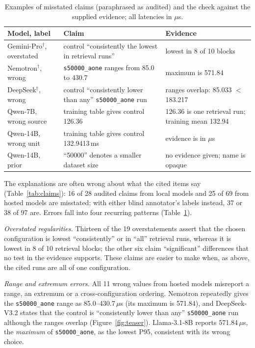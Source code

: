 \begin{table}[t]
\centering\footnotesize\setlength{\tabcolsep}{3pt}
\caption{Examples of misstated claims (paraphrased as audited) and the check against the supplied evidence; all latencies in $\mu$s.}
\label{tab:claim-examples}
\begin{tabular}{@{}p{}p{}p{}@{}}
\toprule
Model, label & Claim & Evidence \\
\midrule
Gemini-Pro$^\dagger$, overstated & control ``consistently the lowest in retrieval runs'' & lowest in 8 of 10 blocks \\
Nemotron$^\dagger$, wrong & \texttt{s50000\_aone} ranges from 85.0 to 430.7 & maximum is 571.84 \\
DeepSeek$^\dagger$, wrong & control ``consistently lower than any'' \texttt{s50000\_aone} run & ranges overlap: 85.033 $<$ 183.217 \\
Qwen-7B, wrong source & training table gives control 126.36 & 126.36 is one retrieval run; training mean 132.94 \\
Qwen-14B, wrong unit & training table gives control 132.9413\,ms & evidence is in $\mu$s \\
Qwen-14B, prior & ``50000'' denotes a smaller dataset size & no evidence given; name is opaque \\
\bottomrule
\end{tabular}
\end{table}

The explanations are often wrong about what the cited items say (Table~\ref{tab:claims}): 16 of 28 audited claims from local models and 25 of 69 from hosted models are misstated; with either blind annotator's labels instead, 37 or 38 of 97 are. Errors fall into four recurring patterns (Table~\ref{tab:claim-examples}).

\emph{Overstated regularities.} Thirteen of the 19 overstatements assert that the chosen configuration is lowest ``consistently'' or in ``all'' retrieval runs, whereas it is lowest in 8 of 10 retrieval blocks; the other six claim ``significant'' differences that no test in the evidence supports. These claims are easier to make when, as above, the cited runs are all of one configuration.

\emph{Range and extremum errors.} All 11 wrong values from hosted models misreport a range, an extremum or a cross-configuration ordering. Nemotron repeatedly gives the \texttt{s50000\_aone} range as 85.0--430.7\,$\mu$s (its maximum is 571.84), and DeepSeek-V3.2 states that the control is ``consistently lower than any'' \texttt{s50000\_aone} run although the ranges overlap (Figure~\ref{fig:teaser}). Llama-3.1-8B reports 571.84\,$\mu$s, the \emph{maximum} of \texttt{s50000\_aone}, as the lowest P95, consistent with its wrong choice.


